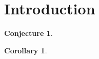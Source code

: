 \documentclass[12pt]{amsart} \usepackage{amscd}
\newtheorem{corollary}{Corollary}%
\theoremstyle{definition}                 \newtheorem{conj}{Conjecture}
\begin{document}
\section{Introduction}\label{introsection}

\begin{conj}
\end{conj}

\begin{defn}
\end{defn}

\begin{notation}
\end{notation}

\begin{corollary}
\end{corollary}
\end{document}
